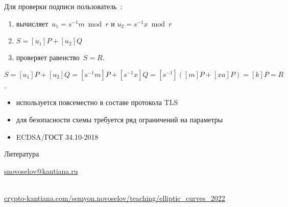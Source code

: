\documentclass{beamer}
\begin{document}
\begin{frame}

Для проверки подписи пользователь~\structure{\faCat}:
\begin{enumerate}
	\item вычисляет~$u_1 = s^{-1} m \bmod{r}$ и $u_2 = s^{-1} x \bmod{r}$
	\item $S = [u_1] P + [u_2] Q$
	\item проверяет равенство~$S = R$.
\end{enumerate}

\vspace{1em}

\structure{$\triangleleft$}
$S = [u_1] P + [u_2] Q = [s^{-1} m] P + [s^{-1} x] Q = [s^{-1}] ([m] P + [x a] P) = [k] P = R$.
\structure{$\triangleright$}

\end{frame}

\begin{frame}{}
\begin{itemize}
	\item используется повсеместно в составе протокола TLS
	\item для безопасности схемы требуется ряд ограничений на параметры
	\item ECDSA/ГОСТ 34.10-2018
\end{itemize}
\end{frame}


\begin{frame}{Литература}
\nocite{Menezes1993}\nocite{Blake1999}\nocite{Washington2008}

\printbibliography


\begin{center}
    \begin{tcolorbox}[enhanced,hbox,colback=block-green-color-bg,colframe=subsection-color!120,title=Контакты,center title]
        \begin{varwidth}{\textwidth}
            \begin{center}
                \href{mailto:snovoselov@kantiana.ru}{snovoselov@kantiana.ru}
            \end{center}
        \end{varwidth}
    \end{tcolorbox}	
\end{center}

\\
{\footnotesize
    \href{https://crypto-kantiana.com/semyon.novoselov/teaching/elliptic_curves_2022}{crypto-kantiana.com/semyon.novoselov/teaching/elliptic\_curves\_2022}
}
\end{frame}
\end{document}
